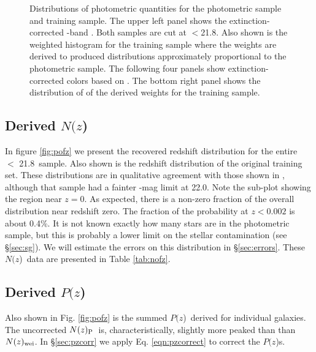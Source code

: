 \documentclass[preprint]{aastex}
\newcommand{\rmax}{21.8}
\newcommand{\pofz}{$P(z$)}
\newcommand{\nofz}{$N(z$)}
\newcommand{\nwei}{N(z)_{\rm wei}}
\newcommand{\npz}{N(z)_{\rm P}}
\begin{document}
\begin{figure}[p] \centering

    \caption{Distributions of photometric quantities for the photometric sample
    and training sample.  The upper left panel shows the extinction-corrected
    \rmag-band \cmodelmag.  Both samples are cut at \rmag$ < $\rmax.  Also
    shown is the weighted histogram for the training sample where the weights
    are derived to produced distributions approximately proportional to the
    photometric sample.  The following four panels show extinction-corrected
    colors based on \modelmag.  The bottom right panel shows the distribution
    of of the derived weights for the training sample. } \label{fig:varhist}

    \vspace{2em}
\end{figure}

\subsection{Derived \nofz}

In figure \ref{fig:pofz} we present the recovered redshift distribution for the entire
\rmag\ $<$ \rmax\ sample.  Also shown is the redshift distribution of the
original training set.  These distributions are in qualitative agreement with
those shown in \citet{CunhaPhotoz09}, although that sample had a fainter
\rmag-mag limit at 22.0.  Note the sub-plot showing the region near $z=0$.  As
expected, there is a non-zero fraction of the overall distribution near redshift zero.  The
fraction of the probability at $z < 0.002$ is about 0.4\%.  It is not known exactly how many
stars are in the photometric sample, but this is probably a lower limit on the
stellar contamination (see \S \ref{sec:sg}).  We will estimate the errors on
this distribution in \S \ref{sec:errors}. These \nofz\ data are presented in
Table \ref{tab:nofz}.


\subsection{Derived \pofz}

Also shown in Fig. \ref{fig:pofz} is the summed \pofz\ derived for individual
galaxies.  The uncorrected $\npz$\ is, characteristically, slightly more peaked than
than $\nwei$.
In \S \ref{sec:pzcorr} we apply Eq. \ref{eqn:pzcorrect} to correct the \pofz s.
\end{document}
